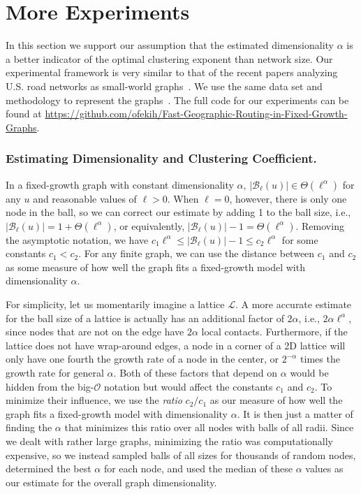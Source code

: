 \section{More Experiments}\label{sec:more-exp}

In this section we support our assumption that the estimated dimensionality
$\alpha$ is a better indicator of the optimal clustering exponent than
network size.
Our experimental framework is very similar to that of the recent papers
analyzing U.S. road networks as small-world
graphs~\cite{goodrich2022modeling,gila2023highway}.
We use the same data set and methodology to represent the
graphs~\cite{routingkit,geisberger2012exact}.
The full code for our experiments can be found at
\url{https://github.com/ofekih/Fast-Geographic-Routing-in-Fixed-Growth-Graphs}.

\subsubsection{Estimating Dimensionality and Clustering Coefficient.}
In a fixed-growth graph with constant dimensionality $\alpha$,
$|\mathcal{B}_\ell(u)| \in \Theta(\ell^\alpha)$ for any $u$ and reasonable
values of $\ell > 0$.
When $\ell = 0$, however, there is only one node in the ball, so we can correct
our estimate by adding 1 to the ball size, i.e., $|\mathcal{B}_\ell(u)| = 1 +
\Theta(\ell^\alpha)$, or equivalently, $|\mathcal{B}_\ell(u)| - 1 =
\Theta(\ell^\alpha)$.
Removing the asymptotic notation, we have $c_1 \ell^\alpha \leq
|\mathcal{B}_\ell(u)| - 1 \leq c_2 \ell^\alpha$ for some constants $c_1 < c_2$.
For any finite graph, we can use the distance between $c_1$ and $c_2$ as some
measure of how well the graph fits a fixed-growth model with dimensionality
$\alpha$.

For simplicity, let us momentarily imagine a lattice $\mathcal{L}$.
A more accurate estimate for the ball size of a lattice is actually has an
additional factor of $2\alpha$, i.e., $2\alpha \ell^\alpha$, since nodes
that are not on the edge have $2 \alpha$ local contacts.
Furthermore, if the lattice does not have wrap-around edges, a node in a corner of a
2D lattice will only have one fourth the growth rate of a node in the center, or
$2^{-\alpha}$ times the growth rate for general $\alpha$.
Both of these factors that depend on $\alpha$ would be hidden from the
big-$\mathcal{O}$ notation but would affect the constants $c_1$ and $c_2$.
To minimize their influence, we use the \textit{ratio} $c_2 / c_1$ as our measure of how
well the graph fits a fixed-growth model with dimensionality $\alpha$.
It is then just a matter of finding the $\alpha$ that minimizes this ratio over all nodes with balls of all radii.
Since we dealt with rather large graphs, minimizing the ratio was
computationally expensive, so we instead sampled balls of all sizes for
thousands of random nodes, determined the best $\alpha$ for each node, and
used the median of these $\alpha$ values as our estimate for the overall graph
dimensionality.

